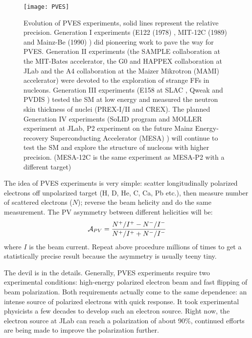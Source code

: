 \begin{figure}[h!]
    \centering
    \texttt{[image: PVES]}
    \caption{Evolution of PVES experiments, solid lines represent the relative 
    precision. Generation I experiments (E122 (1978) \cite{PRESCOTT1978347}, 
    MIT-12C (1989) \cite{PhysRevLett.65.694} and Mainz-Be (1990) \cite{HEIL19891}) 
    did pioneering work to pave the way for PVES. Generation II experiments
    (the SAMPLE collaboration \cite{SAMPLE} at the MIT-Bates accelerator, 
    the G0 \cite{G0} and HAPPEX \cite{HAPPEX} collaboration at JLab and
    the A4 collaboration \cite{A4} at the Maizer Mikrotron (MAMI) accelerator) 
    were devoted to the exploration of strange FFs in nucleons.
    Generation III experiments (E158 at SLAC \cite{PhysRevLett.95.081601}, 
    Qweak \cite{PhysRevLett.111.141803} and PVDIS \cite{PhysRevLett.111.082501})
    tested the SM at low energy and measured the neutron skin thickness of nuclei
    (PREX-I/II and CREX). The planned Generation IV experiments (SoLID program \cite{SoLID}
    and MOLLER experiment \cite{Moller} at JLab, P2 experiment on the future
    Mainz Energy-recovery Superconducting Accelerator (MESA) \cite{MESA-P2})
    will continue to test the SM and explore the structure of nucleons with higher precision.
    (MESA-12C is the same experiment as MESA-P2 with a different \C target) }
\end{figure}

The idea of PVES experiments is very simple: scatter longitudinally polarized
electrons off unpolarized target (H, D, He, C, Ca, Pb etc.), then measure 
number of scattered electrons ($N$); reverse the beam helicity 
and do the same measurement. The PV asymmetry between different helicities will be:
\begin{equation}
    \mathcal{A}_{PV} = \frac{N^+/I^+ - N^-/I^-}{N^+/I^+ + N^-/I^-}
\end{equation}
where $I$ is the beam current.
Repeat above procedure millions of times to get a statistically precise result
because the asymmetry is usually teeny tiny.

The devil is in the details.
Generally, PVES experiments require two experimental conditions: high-energy polarized electron
beam and fast flipping of beam polarization. Both requirements actually come to 
the same dependence: an intense source of polarized electrons with quick response. 
It took experimental physicists a few decades to develop such an electron source.
Right now, the electron source at JLab can reach a polarization of about 90\%,
continued efforts are being made to improve the polarization further.

